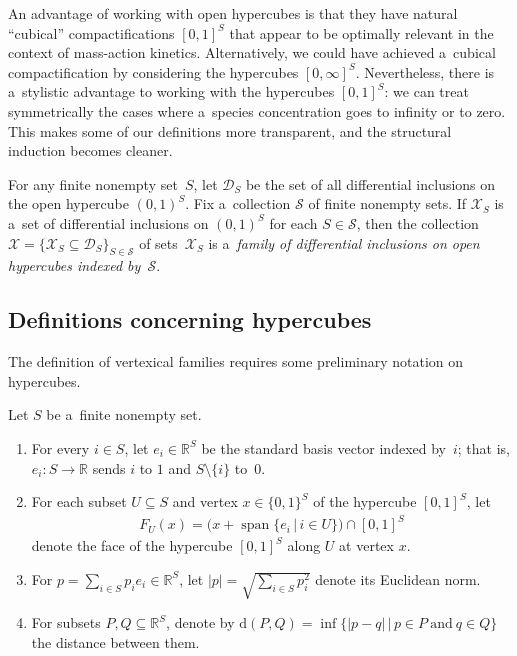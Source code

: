 An advantage of working with open hypercubes is that they have natural ``cubical'' compactif\/ications $[0,1]^S$ that
appear to be optimally relevant in the context of mass-action kinetics.
Alternatively, we could have achieved a~cubical compactif\/ication by considering the hypercubes $[0,\infty]^S$.
Nevertheless, there is a~stylistic advantage to working with the hypercubes $[0,1]^S$: we can treat symmetrically the
cases where a~species concentration goes to inf\/inity or to zero.
This makes some of our def\/initions more transparent, and the structural induction becomes cleaner.
\begin{Definition}
\label{def:diff_incl_fam}
For any f\/inite nonempty set~$S$, let $\mathcal D_S$ be the set of all dif\/ferential inclusions on the open hypercube
$(0,1)^S$.
Fix a~collection $\mathcal S$ of f\/inite nonempty sets.
If $\mathcal X_S$ is a~set of dif\/ferential inclusions on $(0,1)^S$ for each $S\in\mathcal S$, then the collection
$\mathcal X=\{\mathcal X_S\subseteq\mathcal D_S\}_{S\in\mathcal S}$ of sets~$\mathcal X_S$ is a~\emph{family of
differential inclusions on open hypercubes indexed by~$\mathcal S$}.
\end{Definition}

\subsection{Definitions concerning hypercubes}
\label{sub:hypercubes}

The def\/inition of vertexical families requires some preliminary notation on hypercubes.
\begin{Notation}
Let $S$ be a~f\/inite nonempty set.
\begin{enumerate}\itemsep=0pt
\item For every $i\in S$, let $e_i\in\mathbb{R}^S$ be the standard basis vector indexed by~$i$; that is,
$e_i:S\to\mathbb{R}$ sends $i$ to $1$ and $S\setminus\{i\}$ to~$0$.
\item For each subset $U\subseteq S$ and vertex $x\in\{0,1\}^S$ of the hypercube $[0,1]^S$, let
\begin{gather*}
F_U(x)=\big(x+\operatorname{span}\{e_i\,|\, i\in U\}\big)\cap[0,1]^S
\end{gather*}
denote the face of the hypercube $[0,1]^S$ along $U$ at vertex $x$.
\item For $p=\sum\limits_{i\in S}p_i e_i\in\mathbb{R}^S$, let $|p|=\sqrt{\sum\limits_{i\in S}p_i^2}$ denote its Euclidean norm.
\item For subsets $P,Q\subseteq\mathbb{R}^S$, denote by $\mathrm{d}(P,Q)=\inf\big\{|p-q|\,\big|\, p\in P~\text{and}~q\in
Q\big\}$ the distance between them.
\end{enumerate}
\end{Notation}

